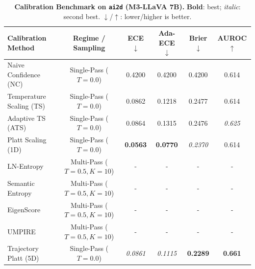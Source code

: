 \begin{table}[t]
\setlength{\tabcolsep}{4pt}
\renewcommand{\arraystretch}{1.05}
\centering
\footnotesize
\begin{tabular}{lccccc}
\toprule
\textbf{Calibration Method} & \textbf{Regime / Sampling} & \textbf{ECE} $\downarrow$ & \textbf{Ada-ECE} $\downarrow$ & \textbf{Brier} $\downarrow$ & \textbf{AUROC} $\uparrow$ \\
\midrule
Naive Confidence (NC) & Single-Pass ($T = 0.0$) & 0.4200 & 0.4200 & 0.4200 & 0.614 \\
Temperature Scaling (TS) & Single-Pass ($T = 0.0$) & 0.0862 & 0.1218 & 0.2477 & 0.614 \\
Adaptive TS (ATS) & Single-Pass ($T = 0.0$) & 0.0864 & 0.1315 & 0.2476 & \textit{0.625} \\
Platt Scaling (1D) & Single-Pass ($T = 0.0$) & \textbf{0.0563} & \textbf{0.0770} & \textit{0.2370} & 0.614 \\
LN-Entropy & Multi-Pass ($T = 0.5, K = 10$) & - & - & - & - \\
Semantic Entropy & Multi-Pass ($T = 0.5, K = 10$) & - & - & - & - \\
EigenScore & Multi-Pass ($T = 0.5, K = 10$) & - & - & - & - \\
UMPIRE & Multi-Pass ($T = 0.5, K = 10$) & - & - & - & - \\
Trajectory Platt (5D) & Single-Pass ($T = 0.0$) & \textit{0.0861} & \textit{0.1115} & \textbf{0.2289} & \textbf{0.661} \\
\bottomrule
\end{tabular}
\caption{\textbf{Calibration Benchmark on \texttt{ai2d} (M3-LLaVA 7B).} \textbf{Bold}: best; \textit{italic}: second best. $\downarrow$/$\uparrow$: lower/higher is better.}
\label{tab:benchmark_m3_ai2d}
\end{table}

